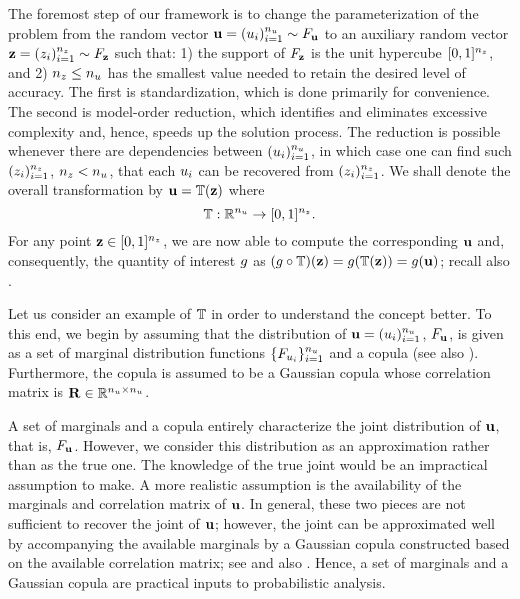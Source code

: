 The foremost step of our framework is to change the parameterization of the
problem from the random vector $\mathbf{u} = (u_i)_{i = 1}^{n_u} \sim F_{\mathbf{u}}$
to an auxiliary random vector $\mathbf{z} = (z_i)_{i = 1}^{n_z} \sim F_{\mathbf{z}}$
such that: 1) the support of $F_{\mathbf{z}}$ is the unit hypercube $[0,
1]^{n_z}$, and 2) ${n_z} \leq {n_u}$ has the smallest value needed to retain the
desired level of accuracy. The first is standardization, which is done primarily
for convenience. The second is model-order reduction, which identifies and
eliminates excessive complexity and, hence, speeds up the solution process. The
reduction is possible whenever there are dependencies between $(u_i)_{i =
1}^{n_u}$, in which case one can find such $(z_i)_{i = 1}^{n_z}$, ${n_z} < {n_u}$, that
each $u_i$ can be recovered from $(z_i)_{i = 1}^{n_z}$. We shall denote the
overall transformation by $\mathbf{u} = \mathbb{T}(\mathbf{z})$ where
\begin{equation} \elab{transformation}
  \transformation: \real^\nu \to [0, 1]^\nz.
\end{equation}
For any point $\mathbf{z} \in [0, 1]^{n_z}$, we are now able to compute the corresponding
$\mathbf{u}$ and, consequently, the quantity of interest $g$ as $(g \circ
\mathbb{T})(\mathbf{z}) = g(\mathbb{T}(\mathbf{z})) = g(\mathbf{u})$; recall also
.

Let us consider an example of $\mathbb{T}$ in order to understand the
concept better. To this end, we begin by assuming that the distribution of $\mathbf{u}
= (u_i)_{i = 1}^{n_u}$, $F_{\mathbf{u}}$, is given as a set of marginal
distribution functions $\{ F_{u_i} \}_{i = 1}^{n_u}$ and a copula
\cite{nelsen2006} (see also ). Furthermore, the copula is
assumed to be a Gaussian copula whose correlation matrix is $\mathbf{R} \in
\mathbb{R}^{{n_u} \times {n_u}}$.

\begin{remark}
A set of marginals and a copula entirely characterize the joint distribution of
$\mathbf{u}$, that is, $F_{\mathbf{u}}$. However, we consider this distribution as
an approximation rather than as the true one. The knowledge of the true joint
would be an impractical assumption to make. A more realistic assumption is the
availability of the marginals and correlation matrix of $\mathbf{u}$. In general, these
two pieces are not sufficient to recover the joint of $\mathbf{u}$; however, the joint
can be approximated well by accompanying the available marginals by a Gaussian
copula constructed based on the available correlation matrix; see \cite{liu1986}
and also \cite{ukhov2014}. Hence, a set of marginals and a Gaussian copula are
practical inputs to probabilistic analysis.
\end{remark}

